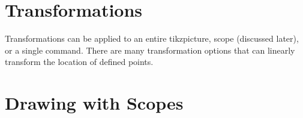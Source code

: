 \documentclass{../../ExampleProblem}
\begin{document}
\section{Transformations}

\begin{paracol}{2}
Transformations can be applied to an entire tikzpicture, scope (discussed later), or a single command. There are many transformation options that can linearly transform the location of defined points.

\switchcolumn


\end{paracol}




\section{Drawing with Scopes}

\end{document}
